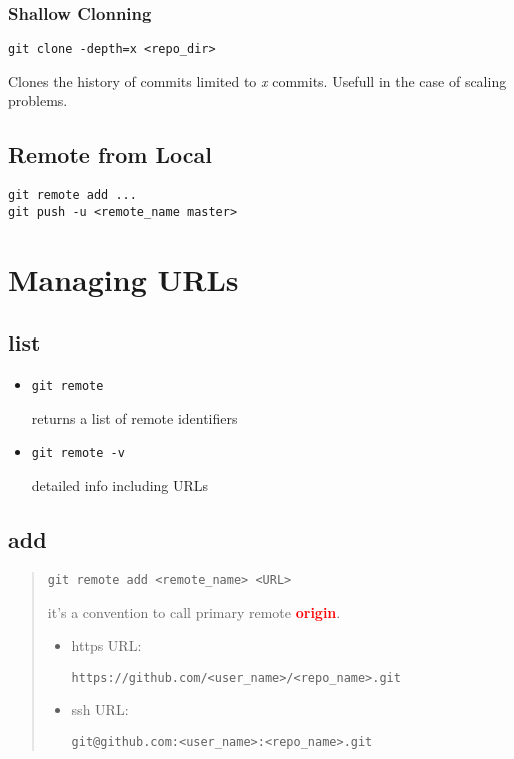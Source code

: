 \documentclass{report}
\begin{document}
\subsubsection{Shallow Clonning}
\begin{verbatim}
git clone -depth=x <repo_dir>
\end{verbatim}
Clones the history of commits limited to \textit{x} commits. Usefull in the case of scaling problems.

\subsection{Remote from Local}
\begin{verbatim}
git remote add ...
git push -u <remote_name master>
\end{verbatim}


\section{Managing URLs}

\subsection{list}
\begin{itemize}
	\item \begin{verbatim}
git remote
	\end{verbatim} 
	returns a list of remote identifiers

	\item \begin{verbatim}
git remote -v
	\end{verbatim}
	detailed info including URLs

\end{itemize}

\subsection{add}
\begin{quote}
\begin{verbatim}
git remote add <remote_name> <URL>
\end{verbatim}
it's a convention to call primary remote \textcolor{red}{\textbf{origin}}.\\
\begin{itemize}
\item https URL:
\begin{verbatim}
https://github.com/<user_name>/<repo_name>.git
\end{verbatim}

\item ssh URL:
\begin{verbatim}
git@github.com:<user_name>:<repo_name>.git
\end{verbatim}
\end{itemize}
\end{quote}
\end{document}
